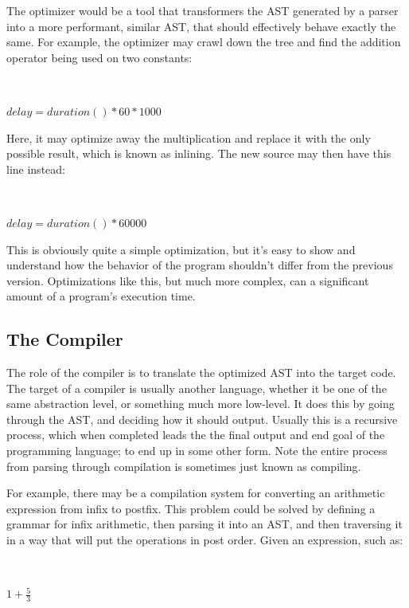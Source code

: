 \documentclass[titlepage]{article}
\begin{document}
			The optimizer would be a tool that transformers the AST generated by a parser into a more performant, similar AST, that should effectively behave exactly the same.  For example, the optimizer may crawl down the tree and find the addition operator being used on two constants:
			\newline

			~\centerline{$delay = duration() * 60 * 1000$}
			\newline

			Here, it may optimize away the multiplication and replace it with the only possible result, which is known as inlining.  The new source may then have this line instead:
			\newline

			~\centerline{$delay = duration() * 60000$}
			\newline

			This is obviously quite a simple optimization, but it's easy to show and understand how the behavior of the program shouldn't differ from the previous version.  Optimizations like this, but much more complex, can a significant amount of a program's execution time.

		\subsection{The Compiler}

			The role of the compiler is to translate the optimized AST into the target code.  The target of a compiler is usually another language, whether it be one of the same abstraction level, or something much more low-level.  It does this by going through the AST, and deciding how it should output.  Usually this is a recursive process, which when completed leads the the final output and end goal of the programming language; to end up in some other form.  Note the entire process from parsing through compilation is sometimes just known as compiling.

			For example, there may be a compilation system for converting an arithmetic expression from infix to postfix.  This problem could be solved by defining a grammar for infix arithmetic, then parsing it into an AST, and then traversing it in a way that will put the operations in post order.  Given an expression, such as:
			\newline

			~\centerline{\Large{$1 + \frac{5}{3}$}}
			\newline
\end{document}
